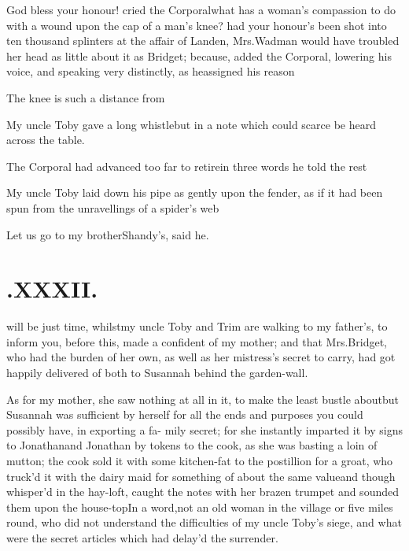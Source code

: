 \documentclass[twoside]{article}
\begin{document}
\tsh God bless your honour! cried the
Corporal\tsh what has a woman’s compassion to do
with a wound upon the cap of a man’s knee? had your
honour’s been shot into ten thousand splinters at the affair
of Landen, Mrs.\@ Wadman would have troubled her head
as little about it as Bridget; because, added the Corporal,
lowering his voice, and speaking very distinctly, as he\break assigned
his reason\tsh{}

\lqq The knee is such a distance from\break
{}

My uncle Toby gave a long whistle\break\tsh but in a
note which could scarce be heard across the table.

The Corporal had advanced too far to retire\tsh in
three words he told the rest\tsh

My uncle Toby laid down his pipe\break
as gently upon the fender, as if it had\break
been spun from the unravellings of a\break
spider’s web\tsh

\tsh Let us go to my brother\break Shandy’s,
said he.

\vfill{}\eject

\section{\chapstrut{}.\enspace XXXII.}

 will be just time, whilst\break my
uncle Toby and Trim are walking to my father’s,
to inform you,\break
{} before this,
made a confident of my mother; and that Mrs.\@ Bridget, who
had the burden of her own, as well as her mistress’s secret
to carry, had got happily delivered of both to Susannah
behind the garden-wall.

As for my mother, she saw nothing at all in it, to make the
least bustle about\break\tsh but Susannah was sufficient
by herself for all the ends and purposes you could possibly have,
in exporting a fa- mily secret; for she instantly imparted it by
signs to Jonathan\tsh and Jonathan by tokens
to the cook, as she was basting a loin of mutton; the cook sold it
with some kitchen-fat to the postillion for a groat, who
truck’d it with the dairy maid for something of about the
same value\tsh and though whisper’d in the hay-loft,
 caught the notes with her brazen trumpet and
sounded them upon the house-top\tsk In a word,\break not an old woman
in the village or five miles round, who did not understand the
difficulties of my uncle Toby’s siege, and what were
the secret articles which had delay’d the
surrender.\tsh
\end{document}
